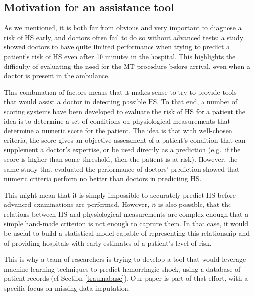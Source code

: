 		\subsection{Motivation for an assistance tool}

As we mentioned, it is both far from obvious and very important to diagnose a risk of HS early, and doctors often fail to do so without advanced tests: a study \cite{pommerening2015gestalt} showed doctors to have quite limited performance when trying to predict a patient's risk of HS even after 10 minutes in the hospital. This highlights the difficulty of evaluating the need for the MT procedure before arrival, even when a doctor is present in the ambulance.

This combination of factors means that it makes sense to try to provide tools that would assist a doctor in detecting possible HS. To that end, a number of scoring systems have been developed to evaluate the risk of HS for a patient \cite{nunez2009ABC} \cite{gonzalez2016resussitation_outcome} \cite{maegele2011TASH} \cite{hamada2018redflag} the idea is to determine a set of conditions on physiological measurements that determine a numeric score for the patient. The idea is that with well-chosen criteria, the score gives an objective assessment of a patient's condition that can supplement a doctor's expertise, or be used directly as a prediction (e.g.\ if the score is higher than some threshold, then the patient is at risk). However, the same study that evaluated the performance of doctors' prediction \cite{pommerening2015gestalt} showed that numeric criteria perform no better than doctors in predicting HS.

This might mean that it is simply impossible to accurately predict HS before advanced examinations are performed. However, it is also possible, that the relations between HS and physiological measurements are complex enough that a simple hand-made criterion is not enough to capture them. In that case, it would be useful to build a statistical model capable of representing this relationship and of providing hospitals with early estimates of a patient's level of risk. 

This is why a team of researchers is trying to develop a tool that would leverage machine learning techniques to predict hemorrhagic shock, using a database of patient records (cf Section \ref{traumabase}). Our paper is part of that effort, with a specific focus on missing data imputation.


